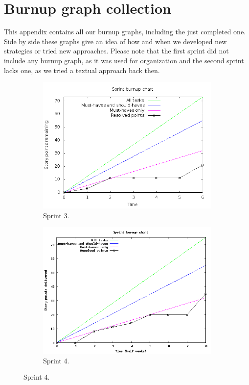 \documentclass[a4paper,11pt]{article}
\begin{document}
\section{Burnup graph collection}
\label{sec:burnup_graphs}
This appendix contains all our burnup graphs, including the just
completed one. Side by side these graphs give an idea of how and when we
developed new strategies or tried new approaches. Please note that the first
sprint did not include any burnup graph, as it was used for organization and the
second sprint lacks one, as we tried a textual approach back then.
\begin{figure}[!ht]
	\centering
	\begin{subfigure}[b]{0.4\textwidth}
		\centering
		\includegraphics[width=\textwidth]{img/burnup_sprint_3.png}
		\caption{Sprint 3.}
	\end{subfigure}
	\begin{subfigure}[b]{0.4\textwidth}
		\centering
		\includegraphics[width=\textwidth]{img/burnup_sprint_4.png}
		\caption{Sprint 4.}
	\end{subfigure}


\end{figure}
\end{document}
